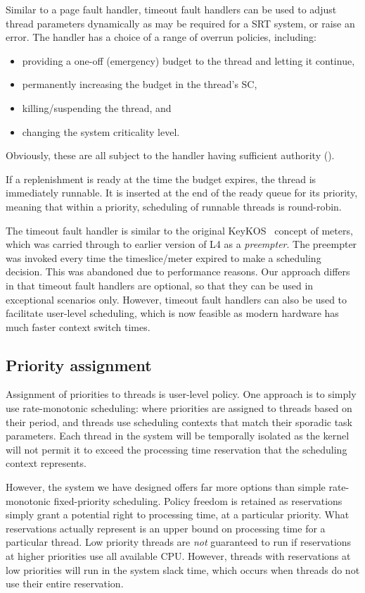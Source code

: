 Similar to a page fault handler, timeout fault handlers can be used to adjust thread parameters dynamically as may be required for a \gls{SRT} system, or raise an error.
The handler has a choice of a range of overrun policies, including:
\begin{itemize}
      \item providing a one-off (emergency) budget to the thread and letting it continue,
       \item permanently increasing the budget in the thread's SC,
       \item killing/suspending the thread, and
       \item changing the system criticality level.
       \end{itemize}
Obviously, these are all subject to the handler having sufficient
authority (\eg \schedcontrol).

If a replenishment is ready at the time the budget expires, the thread
is immediately runnable. It is inserted at the end of the ready queue
for its priority, meaning that within a priority, scheduling of
runnable threads is round-robin.

The timeout fault handler is similar to the original KeyKOS~\citep{Bomberger_FFHLS_92} concept of
meters, which was carried through to earlier version of L4 as a \emph{preempter}. The preempter was
invoked every time the timeslice/meter expired to make a scheduling decision. This was abandoned due
to performance reasons. Our approach differs in that timeout fault handlers are optional, so that
they can be used in exceptional scenarios only. However, timeout fault handlers can also be used to
facilitate user-level scheduling, which is now feasible as modern hardware has much faster context
switch times. 

\subsection{Priority assignment}

Assignment of priorities to threads is user-level policy. One approach is to simply use
rate-monotonic scheduling: where priorities are assigned to threads based on their period, and
threads use scheduling contexts that match their sporadic task parameters.  Each thread in the
system will be temporally isolated as the kernel will not permit it to exceed the processing time
reservation that the scheduling context represents.

However, the system we have designed offers far more options than simple rate-monotonic fixed-priority
scheduling.  Policy freedom is retained as reservations simply grant a potential right to processing
time, at a particular priority.  What reservations actually represent is an upper bound on
processing time for a particular thread.  Low priority threads are \emph{not} guaranteed to run if
reservations at higher priorities use all available CPU.  However, threads with reservations at low
priorities will run in the system slack time, which occurs when threads do not use their entire
reservation.

